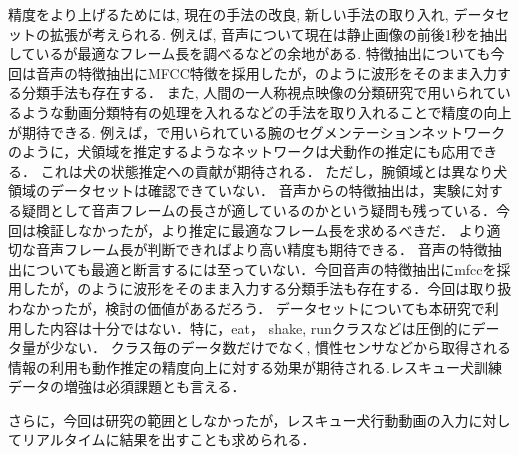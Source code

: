 \documentclass[MIRU,submit]{miru2019j}
\begin{document}
精度をより上げるためには, 現在の手法の改良, 新しい手法の取り入れ, データセットの拡張が考えられる.
例えば, 音声について現在は静止画像の前後1秒を抽出しているが最適なフレーム長を調べるなどの余地がある.
特徴抽出についても今回は音声の特徴抽出にMFCC特徴を採用したが，\cite{aytar2016soundnet}のように波形をそのまま入力する分類手法も存在する．
また, 人間の一人称視点映像の分類研究で用いられているような動画分類特有の処理を入れるなどの手法を取り入れることで精度の向上が期待できる.
例えば，\cite{minghuang2016fpar}で用いられている腕のセグメンテーションネットワークのように，犬領域を推定するようなネットワークは犬動作の推定にも応用できる．
これは犬の状態推定への貢献が期待される．
ただし，腕領域とは異なり犬領域のデータセットは確認できていない．
音声からの特徴抽出は，実験に対する疑問として音声フレームの長さが適しているのかという疑問も残っている．今回は検証しなかったが，より推定に最適なフレーム長を求めるべきだ．
より適切な音声フレーム長が判断できればより高い精度も期待できる．
音声の特徴抽出についても最適と断言するには至っていない．今回音声の特徴抽出にmfccを採用したが，\cite{aytar2016soundnet}のように波形をそのまま入力する分類手法も存在する．今回は取り扱わなかったが，検討の価値があるだろう．
データセットについても本研究で利用した内容は十分ではない．特に，eat， shake, runクラスなどは圧倒的にデータ量が少ない．
クラス毎のデータ数だけでなく, 慣性センサなどから取得される情報の利用も動作推定の精度向上に対する効果が期待される.レスキュー犬訓練データの増強は必須課題とも言える．

さらに，今回は研究の範囲としなかったが，レスキュー犬行動動画の入力に対してリアルタイムに結果を出すことも求められる．




\end{document}
